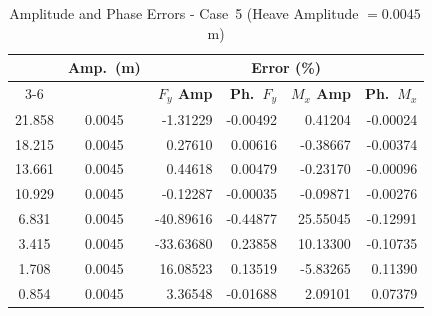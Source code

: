 \documentclass[../main]{subfiles}
\begin{document}
\begin{table}[htbp]
\centering
\caption{Amplitude and Phase Errors - Case~5 (Heave Amplitude $= 0.0045$\,m)}
\label{tab:err_case5}
\renewcommand{\arraystretch}{1.25}
\begin{tabular}{|c|c|r|r|r|r|}
\hline
\rule{0pt}{12pt}
\multirow{2}{*}{\textbf{$U_r$}} &
\multirow{2}{*}{\textbf{Amp.\ (m)}} &
\multicolumn{4}{c|}{\textbf{Error (\%)}} \\[2pt]
\cline{3-6}
\rule{0pt}{10pt} & &
\textbf{$F_y$ Amp} &
\textbf{Ph.\ $F_y$} &
\textbf{$M_x$ Amp} &
\textbf{Ph.\ $M_x$} \\[4pt]
\hline
21.858 & 0.0045 &  -1.31229 & -0.00492 &  0.41204 & -0.00024 \\
18.215 & 0.0045 &   0.27610 &  0.00616 & -0.38667 & -0.00374 \\
13.661 & 0.0045 &   0.44618 &  0.00479 & -0.23170 & -0.00096 \\
10.929 & 0.0045 &  -0.12287 & -0.00035 & -0.09871 & -0.00276 \\
 6.831 & 0.0045 & -40.89616 & -0.44877 & 25.55045 & -0.12991 \\
 3.415 & 0.0045 & -33.63680 &  0.23858 & 10.13300 & -0.10735 \\
 1.708 & 0.0045 &  16.08523 &  0.13519 & -5.83265 &  0.11390 \\
 0.854 & 0.0045 &   3.36548 & -0.01688 &  2.09101 &  0.07379 \\
\hline
\end{tabular}
\end{table}

\FloatBarrier
\end{document}
